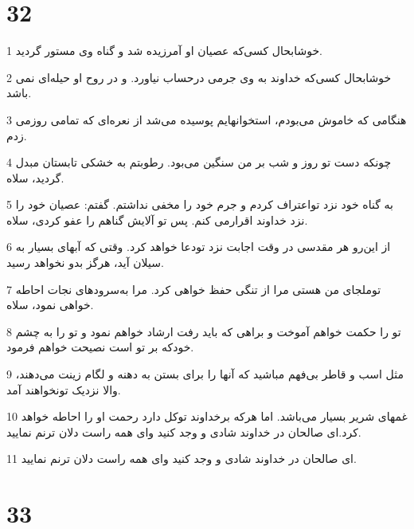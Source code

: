 \chapter{32}

\par 1 خوشابحال کسی‌که عصیان او آمرزیده شد و گناه وی مستور گردید.
\par 2 خوشابحال کسی‌که خداوند به وی جرمی درحساب نیاورد. و در روح او حیله‌ای نمی باشد.
\par 3 هنگامی که خاموش می‌بودم، استخوانهایم پوسیده می‌شد از نعره‌ای که تمامی روزمی زدم.
\par 4 چونکه دست تو روز و شب بر من سنگین می‌بود. رطوبتم به خشکی تابستان مبدل گردید، سلاه.
\par 5 به گناه خود نزد تواعتراف کردم و جرم خود را مخفی نداشتم. گفتم: عصیان خود را نزد خداوند اقرارمی کنم. پس تو آلایش گناهم را عفو کردی، سلاه.
\par 6 از این‌رو هر مقدسی در وقت اجابت نزد تودعا خواهد کرد. وقتی که آبهای بسیار به سیلان آید، هرگز بدو نخواهد رسید.
\par 7 توملجای من هستی مرا از تنگی حفظ خواهی کرد. مرا به‌سرودهای نجات احاطه خواهی نمود، سلاه.
\par 8 تو را حکمت خواهم آموخت و براهی که باید رفت ارشاد خواهم نمود و تو را به چشم خودکه بر تو است نصیحت خواهم فرمود.
\par 9 مثل اسب و قاطر بی‌فهم مباشید که آنها را برای بستن به دهنه و لگام زینت می‌دهند، والا نزدیک تونخواهند آمد.
\par 10 غمهای شریر بسیار می‌باشد. اما هر‌که برخداوند توکل دارد رحمت او را احاطه خواهد کرد.‌ای صالحان در خداوند شادی و وجد کنید و‌ای همه راست دلان ترنم نمایید. 
\par 11 ‌ای صالحان در خداوند شادی و وجد کنید و‌ای همه راست دلان ترنم نمایید.
 
\chapter{33}

